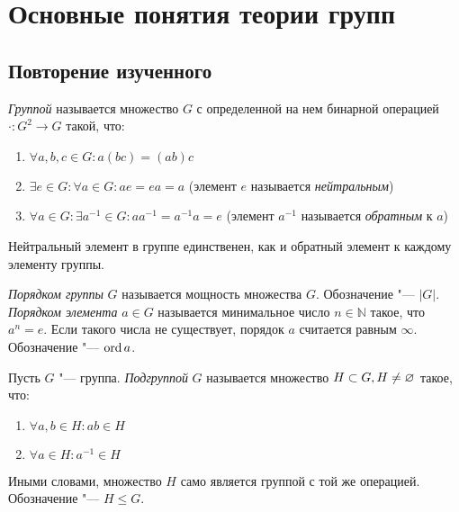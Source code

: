 \section{Основные понятия теории групп}

\subsection{Повторение изученного}

\begin{definition}
	\textit{Группой} называется множество $G$ с определенной на нем бинарной операцией $\cdot: G^2 \to G$ такой, что:
	\begin{enumerate}
		\item $\forall a, b, c \in G: a(bc) = (ab)c$
		
		\item $\exists e \in G: \forall a \in G: ae = ea = a$ (элемент $e$ называется \textit{нейтральным})
		
		\item $\forall a \in G: \exists a^{-1} \in G: aa^{-1} = a^{-1}a = e$ (элемент $a^{-1}$ называется \textit{обратным} к $a$)
	\end{enumerate}
\end{definition}

\begin{reminder}
	Нейтральный элемент в группе единственен, как и обратный элемент к каждому элементу группы.
\end{reminder}

\begin{definition}
	\textit{Порядком группы} $G$ называется мощность множества $G$. Обозначение "--- $|G|$. \textit{Порядком элемента} $a \in G$ называется минимальное число $n \in \mathbb{N}$ такое, что $a^n = e$. Если такого числа не существует, порядок $a$ считается равным $\infty$. Обозначение "--- $\operatorname{ord}{a}$.
\end{definition}

\begin{definition}
	Пусть $G$ "--- группа. \textit{Подгруппой} $G$ называется множество $H \subset G, H \hm\ne \emptyset$ такое, что:
	\begin{enumerate}
		\item $\forall a, b \in H: ab \in H$
		
		\item $\forall a \in H: a^{-1} \in H$
	\end{enumerate}
	
	Иными словами, множество $H$ само является группой с той же операцией. Обозначение "--- $H \le G$.
\end{definition}

